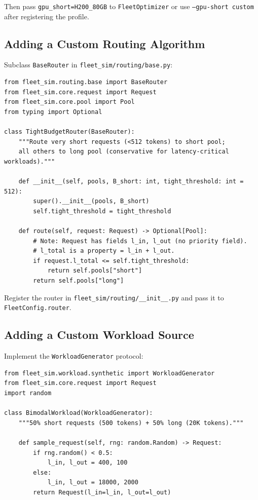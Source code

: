 \documentclass[11pt,a4paper]{article}
\begin{document}
Then pass \texttt{gpu\_short=H200\_80GB} to \texttt{FleetOptimizer}
or use \texttt{--gpu-short custom} after registering the profile.

\subsection{Adding a Custom Routing Algorithm}

Subclass \texttt{BaseRouter} in \texttt{fleet\_sim/routing/base.py}:

\begin{lstlisting}[style=python]
from fleet_sim.routing.base import BaseRouter
from fleet_sim.core.request import Request
from fleet_sim.core.pool import Pool
from typing import Optional

class TightBudgetRouter(BaseRouter):
    """Route very short requests (<512 tokens) to short pool;
    all others to long pool (conservative for latency-critical workloads)."""

    def __init__(self, pools, B_short: int, tight_threshold: int = 512):
        super().__init__(pools, B_short)
        self.tight_threshold = tight_threshold

    def route(self, request: Request) -> Optional[Pool]:
        # Note: Request has fields l_in, l_out (no priority field).
        # l_total is a property = l_in + l_out.
        if request.l_total <= self.tight_threshold:
            return self.pools["short"]
        return self.pools["long"]
\end{lstlisting}

Register the router in \texttt{fleet\_sim/routing/\_\_init\_\_.py}
and pass it to \texttt{FleetConfig.router}.

\subsection{Adding a Custom Workload Source}

Implement the \texttt{WorkloadGenerator} protocol:

\begin{lstlisting}[style=python]
from fleet_sim.workload.synthetic import WorkloadGenerator
from fleet_sim.core.request import Request
import random

class BimodalWorkload(WorkloadGenerator):
    """50% short requests (500 tokens) + 50% long (20K tokens)."""

    def sample_request(self, rng: random.Random) -> Request:
        if rng.random() < 0.5:
            l_in, l_out = 400, 100
        else:
            l_in, l_out = 18000, 2000
        return Request(l_in=l_in, l_out=l_out)
\end{lstlisting}
\end{document}
